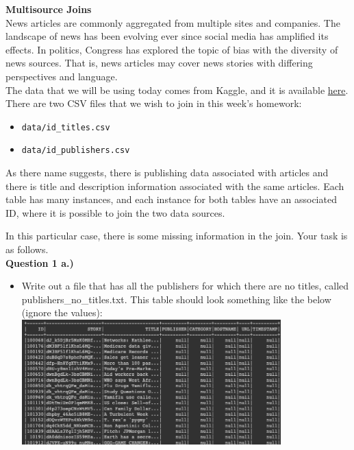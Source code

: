 \documentclass[paper=a4, fontsize=11pt]{scrartcl} %
\author{
    \textbf{YOUR NAME} \\ 
    \textbf{YOUR GIT USERNAME} \\ 
    \textbf{YOUR E-MAIL}
}%
\begin{document}
\maketitle %

{\huge \textbf{Multisource Joins}}  \\

News articles are commonly aggregated from multiple sites and companies. The landscape of news has been evolving ever since social media has amplified its effects. In politics, Congress has explored the topic of bias with the diversity of news sources. That is, news articles may cover news stories with differing perspectives and language. \\

The data that we will be using today comes from Kaggle, and it is available \href{https://course.ccs.neu.edu/cs6220/homework-3/}{here}. There are two CSV files that we wish to join in this week's homework:

\begin{itemize}
    \item \verb"data/id_titles.csv"
    \item \verb"data/id_publishers.csv"
\end{itemize}

As there name suggests, there is publishing data associated with articles and there is title and description information associated with the same articles. Each table has many instances, and each instance for both tables have an associated ID, where it is possible to join the two data sources.

In this particular case, there is some missing information in the join. Your task is as follows. \\

\textbf{Question 1 a.)}
\begin{itemize}
    \item Write out a file that has all the publishers for which there are no titles, called publishers\_no\_titles.txt. This table should look something like the below (ignore the values): \\
    \includegraphics[width=100mm]{images/pub_no_title.png}
\end{itemize} \\
\end{document}
